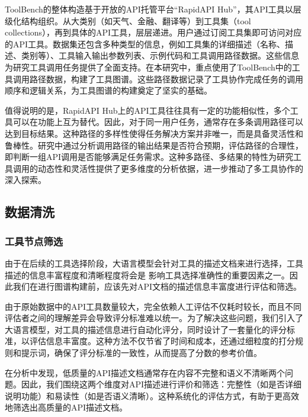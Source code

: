 ToolBench的整体构造基于开放的API托管平台“RapidAPI Hub”，其API工具以层级化结构组织。从大类别（如天气、金融、翻译等）到工具集（tool collections），再到具体的API工具，层层递进。用户通过订阅工具集即可访问对应的API工具。数据集还包含多种类型的信息，例如工具集的详细描述（名称、描述、类别等）、工具输入输出参数列表、示例代码和工具调用路径数据。这些信息为研究工具调用任务提供了全面支持。在本研究中，重点使用了ToolBench中的工具调用路径数据，构建了工具图谱。这些路径数据记录了工具协作完成任务的调用顺序和逻辑关系，为工具图谱的构建奠定了坚实的基础。

值得说明的是，RapidAPI Hub上的API工具往往具有一定的功能相似性，多个工具可以在功能上互为替代。因此，对于同一用户任务，通常存在多条调用路径可以达到目标结果。这种路径的多样性使得任务解决方案并非唯一，而是具备灵活性和鲁棒性。研究中通过分析调用路径的输出结果是否符合预期，评估路径的合理性，即判断一组API调用是否能够满足任务需求。这种多路径、多结果的特性为研究工具调用的动态性和灵活性提供了更多维度的分析依据，进一步推动了多工具协作的深入探索。

\subsection{数据清洗}

\subsubsection{工具节点筛选}


由于在后续的工具选择阶段，大语言模型会针对工具的描述文档来进行选择，工具描述的信息丰富程度和清晰程度将会是
影响工具选择准确性的重要因素之一。因此我们在进行图谱构建前，应该先对API文档的描述信息丰富度进行评估和筛选。

由于原始数据中的API工具数量较大，完全依赖人工评估不仅耗时较长，而且不同评估者之间的理解差异会导致评分标准难以统一。为了解决这些问题，我们引入了大语言模型，对工具的描述信息进行自动化评分，同时设计了一套量化的评分标准，以评估信息丰富度。这种方法不仅节省了时间和成本，还通过细粒度的打分规则和提示词，确保了评分标准的一致性，从而提高了分数的参考价值。

在分析中发现，低质量的API描述文档通常存在内容不完整和语义不清晰两个问题。因此，我们围绕这两个维度对API描述进行评价和筛选：完整性（如是否详细说明功能）和易读性（如是否语义清晰）。这种系统化的评估方式，有助于更高效地筛选出高质量的API描述文档。

